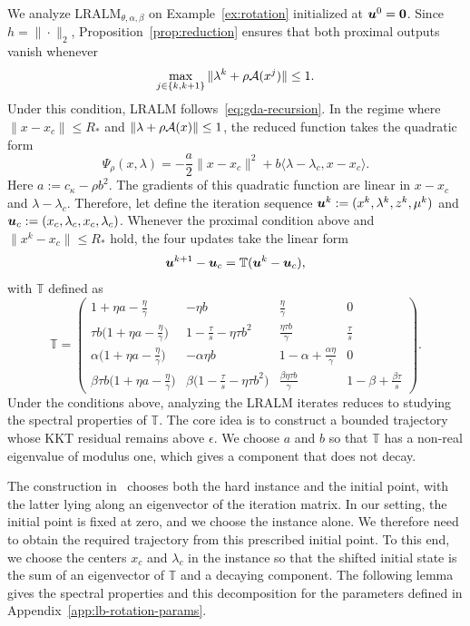 We analyze \(\mathrm{LRALM}_{\theta,\alpha,\beta}\) on Example~\ref{ex:rotation}
initialized at \(\bm{u}^0=\bm{0}\). Since \(h=\|\cdot\|_2\), Proposition~\ref{prop:reduction} ensures that both proximal outputs vanish
whenever
\[
\max_{j\in\{k,k+1\}}\|\lambda^k+\rho\mathcal{A}(x^j)\|\le1.
\] 
Under this condition, LRALM follows~\eqref{eq:gda-recursion}. In the regime where \(\|x-x_c\|\le R_*\) and \(\|\lambda+\rho\mathcal{A}(x)\|\le1\),
the reduced function takes the quadratic form
\[
\Psi_\rho(x,\lambda)
=-\frac{a}{2}\|x-x_c\|^2+b\langle\lambda-\lambda_c,x-x_c\rangle .
\]
Here \(a:=c_\kappa-\rho b^2\). The gradients of this quadratic function are
linear in \(x-x_c\) and \(\lambda-\lambda_c\). 
Therefore, let define the iteration sequence \(\bm{u}^k:=(x^k,\lambda^k,z^k,\mu^k)\) and
\(\bm{u}_c:=(x_c,\lambda_c,x_c,\lambda_c)\). Whenever the proximal condition
above and \(\|x^k-x_c\|\le R_*\) hold, the four updates take the linear form
\[
\bm{u}^{k+1}-\bm{u}_c=\mathbb T(\bm{u}^k-\bm{u}_c),
\] with \(\mathbb T\) defined as 
\begin{equation}
\label{eq:rot-matrix}
\mathbb T=\begin{pmatrix}
1+\eta a-\tfrac{\eta}{\gamma} & -\eta b & \tfrac{\eta}{\gamma} & 0\\[2pt]
\tau b\bigl(1+\eta a-\tfrac{\eta}{\gamma}\bigr) & 1-\tfrac{\tau}{s}-\eta\tau b^2
  & \tfrac{\eta\tau b}{\gamma} & \tfrac{\tau}{s}\\[2pt]
\alpha\bigl(1+\eta a-\tfrac{\eta}{\gamma}\bigr) & -\alpha\eta b
  & 1-\alpha+\tfrac{\alpha\eta}{\gamma} & 0\\[2pt]
\beta\tau b\bigl(1+\eta a-\tfrac{\eta}{\gamma}\bigr)
  & \beta\bigl(1-\tfrac{\tau}{s}-\eta\tau b^2\bigr)
  & \tfrac{\beta\eta\tau b}{\gamma} & 1-\beta+\tfrac{\beta\tau}{s}
\end{pmatrix}.
\end{equation}
Under the conditions above, analyzing the LRALM iterates reduces to
studying the spectral properties of \(\mathbb T\).
The core idea is to construct a bounded trajectory whose KKT residual remains
above \(\epsilon\). We choose \(a\) and \(b\) so that \(\mathbb T\) has a
non-real eigenvalue of modulus one, which gives a component that does not
decay.

The construction in~\cite[Section~5.1.1]{li2026smoothing} chooses both the
hard instance and the initial point, with the latter lying along an
eigenvector of the iteration matrix. In our setting, the initial point is
fixed at zero, and we choose the instance alone. We therefore need to
obtain the required trajectory from this prescribed initial point. To this
end, we choose the centers \(x_c\) and \(\lambda_c\) in the instance so that
the shifted initial state is the sum of an eigenvector of \(\mathbb T\)
and a decaying component. The following lemma gives the spectral
properties and this decomposition for the parameters defined
in Appendix~\ref{app:lb-rotation-params}.


